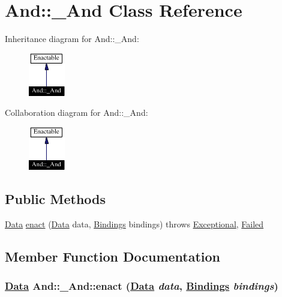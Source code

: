\hypertarget{classAnd_1_1__And}{
\section{And::\_\-And  Class Reference}
\label{classAnd_1_1__And}
}
Inheritance diagram for And::\_\-And:\begin{figure}[H]
\begin{center}
\leavevmode
\includegraphics[width=45pt]{classAnd_1_1__And__inherit__graph}
\end{center}
\end{figure}
Collaboration diagram for And::\_\-And:\begin{figure}[H]
\begin{center}
\leavevmode
\includegraphics[width=45pt]{classAnd_1_1__And__coll__graph}
\end{center}
\end{figure}
\subsection*{Public Methods}
\begin{CompactItemize}
\item 
\hyperlink{interfaceData}{Data} \hyperlink{classAnd_1_1__And_a0}{enact} (\hyperlink{interfaceData}{Data} data, \hyperlink{interfaceBindings}{Bindings} bindings) throws \hyperlink{classExceptional}{Exceptional}, \hyperlink{classFailed}{Failed}
\end{CompactItemize}


\subsection{Member Function Documentation}
\hypertarget{classAnd_1_1__And_a0}{
\subsubsection[enact]{\setlength{\rightskip}{0pt plus 5cm}\hyperlink{interfaceData}{Data} And::\_\-And::enact (\hyperlink{interfaceData}{Data} {\em data}, \hyperlink{interfaceBindings}{Bindings} {\em bindings})}}
\label{classAnd_1_1__And_a0}




